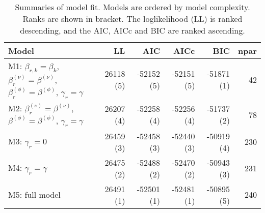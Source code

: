 \begin{table}[ht]
\centering
\begingroup\fontsize{9pt}{10pt}\selectfont
\begin{tabular}{l|rrrrr}
  \hline
Model & LL & AIC & AICc & BIC & npar \\ 
  \hline
M1: $\beta_{r,k} = \beta_{k}$, $\beta_{r}^{(\nu)} = \beta^{(\nu)}$, $\beta_{r}^{(\phi)} = \beta^{(\phi)}$, $\gamma_r = \gamma$ & 26118 (5) & -52152 (5) & -52151 (5) & -51871 (1) & 42 \\ 
  M2: $\beta_{r}^{(\nu)} = \beta^{(\nu)}$, $\beta^{(\phi)} = \beta^{(\phi)}$, $\gamma_r = \gamma$ & 26207 (4) & -52258 (4) & -52256 (4) & -51737 (2) & 78 \\ 
  M3: $\gamma_r = 0$ & 26459 (3) & -52458 (3) & -52440 (3) & -50919 (4) & 230 \\ 
  M4: $\gamma_r = \gamma$ & 26475 (2) & -52488 (2) & -52470 (2) & -50943 (3) & 231 \\ 
  M5: full model & 26491 (1) & -52501 (1) & -52481 (1) & -50895 (5) & 240 \\ 
   \hline
\end{tabular}
\endgroup
\caption{Summaries of model fit. 
             Models are ordered by model complexity.
             Ranks are shown in bracket.
             The loglikelihood (LL) is ranked descending, 
             and the AIC, AICc and BIC are ranked ascending.} 
\label{tab:mBetafit}
\end{table}
